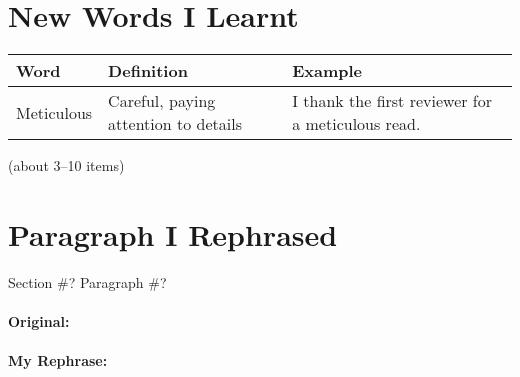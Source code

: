 \documentclass{article}                 %
\begin{document}
\section{New Words I Learnt}
\begin{adjustbox}{W=1}
\begin{tabular}{m{20ex}p{}p{}}
  \toprule
  Word & Definition & Example \\
  \midrule
  Meticulous & Careful, paying attention to details & I thank the first reviewer for a meticulous read. \\
  \bottomrule
\end{tabular}
\end{adjustbox}
(about 3--10 items)

\section{Paragraph I Rephrased}
Section \#? Paragraph \#?
\paragraph{Original: }
\paragraph{My Rephrase: }
\end{document}
